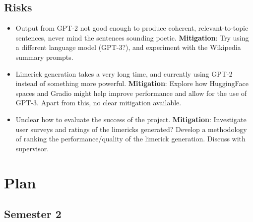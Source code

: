 \documentclass[11pt]{article}
\begin{document}
\subsection{Risks}\label{risks}

\begin{itemize}
\tightlist
\item   Output from GPT-2 not good enough to produce coherent, relevant-to-topic sentences, never mind the sentences sounding poetic.  \textbf{Mitigation}: Try using a different language model (GPT-3?), and experiment with the Wikipedia summary prompts.
\item Limerick generation takes a very long time, and currently using GPT-2 instead of something more powerful. \textbf{Mitigation}: Explore how HuggingFace spaces and Gradio might help improve performance and allow for the use of GPT-3. Apart from this, no clear mitigation available.
\item Unclear how to evaluate the success of the project. \textbf{Mitigation}: Investigate user surveys and ratings of the limericks generated? Develop a methodology of ranking the performance/quality of the limerick generation. Discuss with supervisor.
\end{itemize}
    
\section{Plan}\label{plan}

\subsection{Semester 2}
\end{document}
